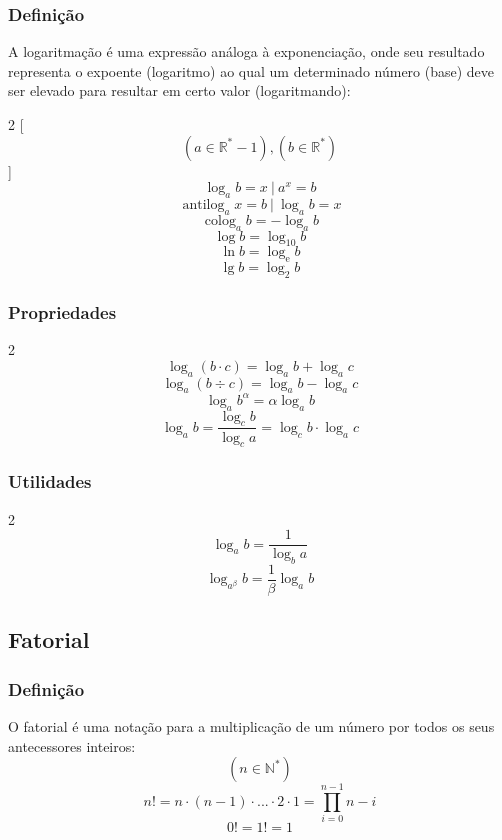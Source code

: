     \subsubsection{Definição}
        A logaritmação é uma expressão análoga à exponenciação, onde seu resultado representa o expoente (logaritmo) ao qual um determinado número (base) deve ser elevado para resultar em certo valor (logaritmando):
        \begin{multicols}{2}
            [\[ (a \in \mathbb{R}^{*}-1), (b \in \mathbb{R}^*) \]]
            \noindent\[ \log_{a}b = x \ | \ a^x = b \]
            \[ \operatorname{antilog}_{a}x=b \ | \ \log_{a}b = x \]
            \[ \operatorname{colog}_{a}b = -\log_{a}b \]
            \[ \log b = \log_{10}b \]
            \[ \ln b = \log_{\mathrm{e}}b \]
            \[ \lg b = \log_{2}b \]
        \end{multicols}
    \subsubsection{Propriedades}
        \begin{multicols}{2}
            \noindent\[ \log_{a}(b \cdot c) = \log_{a}b + \log_{a}c \]
            \[ \log_{a}(b \div c) = \log_{a}b - \log_{a}c \]
            \newcolumn
            \[ \log_{a}b^{\alpha} = \alpha \log_{a}b \]
            \[ \log_{a}b = \frac{\log_{c}b}{\log_{c}a} = \log_{c}b \cdot \log_{a}c \]
        \end{multicols}
    \subsubsection{Utilidades}
        \begin{multicols}{2}
            \noindent\[ \log_{a}b = \frac{1}{\log_{b}a} \]
            \[ \log_{a^{\beta}}b = \frac{1}{\beta}\log_{a}b \]
        \end{multicols}
\subsection{Fatorial}
    \subsubsection{Definição}
        O fatorial é uma notação para a multiplicação de um número por todos os seus antecessores inteiros:
        \[ (n \in \mathbb{N}^*) \]
        \[ n! = n \cdot (n-1) \cdot ... \cdot 2 \cdot 1 = \displaystyle\prod_{i=0}^{n-1} {n-i}  \]
        \[ 0! = 1! = 1 \]
